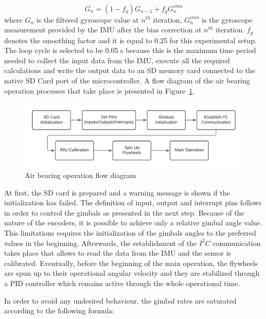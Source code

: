 \documentclass[aerospace,article,submit,moreauthors,dvi2pdf]{Definitions/mdpi}
\begin{document}
\begin{equation}
G_n=(1-f_g) G_{n-1} +f_g G_n^{imu}
\end{equation}
where $G_n$ is the filtered gyroscope value at  $n^{th}$ iteration, $G_n^{imu}$ is the gyroscope measurement provided by the IMU after the bias correction at  $n^{th}$ iteration. $f_g$ denotes the smoothing factor and it is equal to 0.25 for this experimental setup. The loop cycle is selected to be 0.05 s because this is the maximum time period needed to collect the input data from the IMU, execute all the required calculations and write the output data to an SD memory card connected to the native SD Card port of the microcontroller. A flow diagram of the air bearing operation processes that take place is presented in Figure~\ref{fig:start_steps}. 
\begin{figure}[H]
\includegraphics[width=13cm]{startflow.pdf}
\caption{Air bearing operation flow diagram \label{fig:start_steps}}
\end{figure}
At first, the SD card is prepared and a warning message is shown if the initialization has failed. The definition of input, output and interrupt pins follows in order to control the gimbals as presented in the next step. Because of the nature of the encoders, it is possible to achieve only a relative gimbal angle value. This limitations requires the initialization of the gimbals angles to the preferred values in the beginning. Afterwards, the establishment of the $I^2C$ communication takes place that allows to read the data from the IMU and the sensor is calibrated. Eventually, before the beginning of the main operation,  the flywheels are spun up to their operational angular velocity and they are stabilized through a PID controller which remains active through the whole operational time. 

In order to avoid any undesired behaviour, the gimbal rates are saturated according to the following formula:
\end{document}
